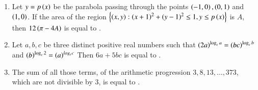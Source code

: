 \documentclass[journal]{IEEEtran}
\begin{document}
\begin{enumerate}[start=16]
\item Let $y = p\left(x\right)$ be the parabola passing through the points $\left(-1, 0\right), \left(0, 1\right)$ and $\left(1, 0\right)$. If the area of the region 
$\left\{\left(x, y\right) : \left(x+1\right)^2+\left(y-1\right)^2 \leq 1, y \leq p\left(x\right)\right\}$ is $A$, then $12\left(\pi - 4A\right)$ is equal to \underline{\hspace{1cm}}.
\item Let $a, b, c$ be three distinct positive real numbers such that 
$\left(2a\right)^{\log_e a} = \left(bc\right)^{\log_e b}$ and $\left(b\right)^{\log_e 2} = \left(a\right)^{log_e c}$
Then $6a + 5bc$ is equal to \underline{\hspace{1cm}}.
\item The sum of all those terms, of the arithmetic progression $3, 8, 13, \dots, 373$, which are not divisible by $3$, is equal to \underline{\hspace{1cm}}.
\end{enumerate}
\end{document}
